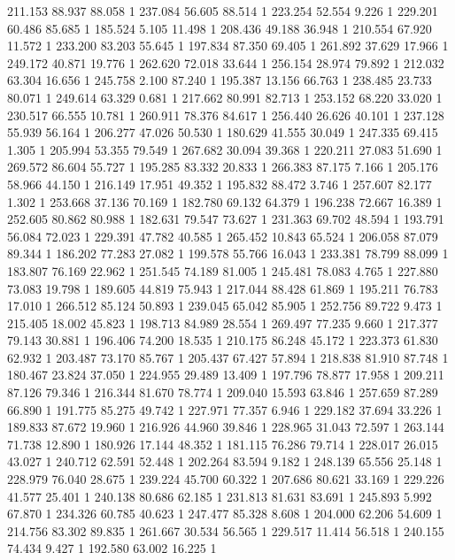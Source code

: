 	211.153	88.937	88.058	1
	237.084	56.605	88.514	1
	223.254	52.554	9.226	1
	229.201	60.486	85.685	1
	185.524	5.105	11.498	1
	208.436	49.188	36.948	1
	210.554	67.920	11.572	1
	233.200	83.203	55.645	1
	197.834	87.350	69.405	1
	261.892	37.629	17.966	1
	249.172	40.871	19.776	1
	262.620	72.018	33.644	1
	256.154	28.974	79.892	1
	212.032	63.304	16.656	1
	245.758	2.100	87.240	1
	195.387	13.156	66.763	1
	238.485	23.733	80.071	1
	249.614	63.329	0.681	1
	217.662	80.991	82.713	1
	253.152	68.220	33.020	1
	230.517	66.555	10.781	1
	260.911	78.376	84.617	1
	256.440	26.626	40.101	1
	237.128	55.939	56.164	1
	206.277	47.026	50.530	1
	180.629	41.555	30.049	1
	247.335	69.415	1.305	1
	205.994	53.355	79.549	1
	267.682	30.094	39.368	1
	220.211	27.083	51.690	1
	269.572	86.604	55.727	1
	195.285	83.332	20.833	1
	266.383	87.175	7.166	1
	205.176	58.966	44.150	1
	216.149	17.951	49.352	1
	195.832	88.472	3.746	1
	257.607	82.177	1.302	1
	253.668	37.136	70.169	1
	182.780	69.132	64.379	1
	196.238	72.667	16.389	1
	252.605	80.862	80.988	1
	182.631	79.547	73.627	1
	231.363	69.702	48.594	1
	193.791	56.084	72.023	1
	229.391	47.782	40.585	1
	265.452	10.843	65.524	1
	206.058	87.079	89.344	1
	186.202	77.283	27.082	1
	199.578	55.766	16.043	1
	233.381	78.799	88.099	1
	183.807	76.169	22.962	1
	251.545	74.189	81.005	1
	245.481	78.083	4.765	1
	227.880	73.083	19.798	1
	189.605	44.819	75.943	1
	217.044	88.428	61.869	1
	195.211	76.783	17.010	1
	266.512	85.124	50.893	1
	239.045	65.042	85.905	1
	252.756	89.722	9.473	1
	215.405	18.002	45.823	1
	198.713	84.989	28.554	1
	269.497	77.235	9.660	1
	217.377	79.143	30.881	1
	196.406	74.200	18.535	1
	210.175	86.248	45.172	1
	223.373	61.830	62.932	1
	203.487	73.170	85.767	1
	205.437	67.427	57.894	1
	218.838	81.910	87.748	1
	180.467	23.824	37.050	1
	224.955	29.489	13.409	1
	197.796	78.877	17.958	1
	209.211	87.126	79.346	1
	216.344	81.670	78.774	1
	209.040	15.593	63.846	1
	257.659	87.289	66.890	1
	191.775	85.275	49.742	1
	227.971	77.357	6.946	1
	229.182	37.694	33.226	1
	189.833	87.672	19.960	1
	216.926	44.960	39.846	1
	228.965	31.043	72.597	1
	263.144	71.738	12.890	1
	180.926	17.144	48.352	1
	181.115	76.286	79.714	1
	228.017	26.015	43.027	1
	240.712	62.591	52.448	1
	202.264	83.594	9.182	1
	248.139	65.556	25.148	1
	228.979	76.040	28.675	1
	239.224	45.700	60.322	1
	207.686	80.621	33.169	1
	229.226	41.577	25.401	1
	240.138	80.686	62.185	1
	231.813	81.631	83.691	1
	245.893	5.992	67.870	1
	234.326	60.785	40.623	1
	247.477	85.328	8.608	1
	204.000	62.206	54.609	1
	214.756	83.302	89.835	1
	261.667	30.534	56.565	1
	229.517	11.414	56.518	1
	240.155	74.434	9.427	1
	192.580	63.002	16.225	1
